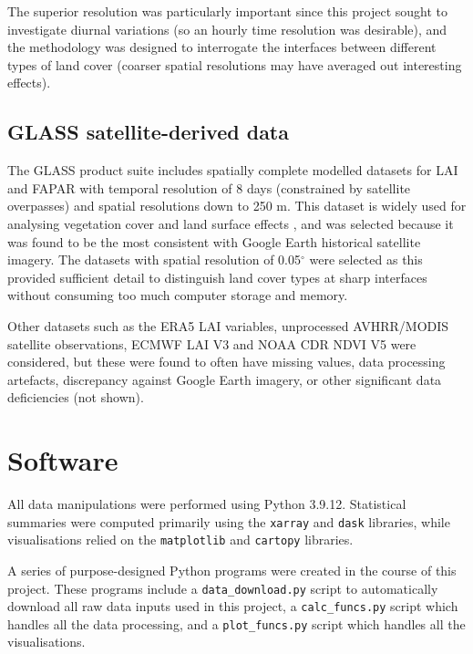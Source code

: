 The superior resolution was particularly important since this project sought to investigate diurnal variations (so an hourly time resolution was desirable), and the methodology was designed to interrogate the interfaces between different types of land cover (coarser spatial resolutions may have averaged out interesting effects).

\subsection{GLASS satellite-derived data}

The \ac{GLASS} product suite includes spatially complete modelled datasets for \ac{LAI} and \ac{FAPAR} with temporal resolution of 8 days (constrained by satellite overpasses) and spatial resolutions down to 250 m. This dataset is widely used for analysing vegetation cover and land surface effects \citep{fang2019, liang2021}, and was selected because it was found to be the most consistent with Google Earth historical satellite imagery. The datasets with spatial resolution of 0.05$^\circ$ were selected as this provided sufficient detail to distinguish land cover types at sharp interfaces without consuming too much computer storage and memory.

Other datasets such as the \ac{ERA5} \ac{LAI} variables, unprocessed {AVHRR}/{MODIS} satellite observations, \ac{ECMWF} \ac{LAI} V3 and \ac{NOAA} \ac{CDR} \ac{NDVI} V5 were considered, but these were found to often have missing values, data processing artefacts, discrepancy against Google Earth imagery, or other significant data deficiencies (not shown).

\section{Software}

All data manipulations were performed using Python 3.9.12. Statistical summaries were computed primarily using the \verb+xarray+ \citep{xarray} and \verb+dask+ \citep{dask} libraries, while visualisations relied on the \verb+matplotlib+ \citep{matplotlib} and \verb+cartopy+ \citep{cartopy} libraries.

A series of purpose-designed Python programs were created in the course of this project. These programs include a \verb+data_download.py+ script to automatically download all raw data inputs used in this project, a \verb+calc_funcs.py+ script which handles all the data processing, and a \verb+plot_funcs.py+ script which handles all the visualisations. 

